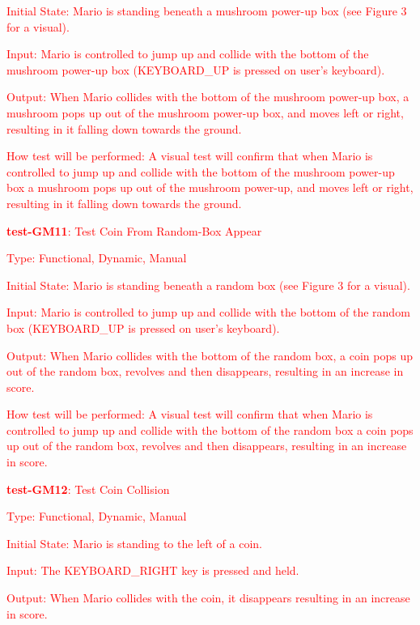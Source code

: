 \documentclass[12pt, titlepage]{article}
\begin{document}
\begin{enumerate}
\textcolor{red}{Initial State: Mario is standing beneath a mushroom power-up box (see Figure 3 for a visual).}

\textcolor{red}{Input: Mario is controlled to jump up and collide with the bottom of the mushroom power-up box (KEYBOARD\_UP is pressed on user's keyboard).}

\textcolor{red}{Output: When Mario collides with the bottom of the mushroom power-up box, a mushroom pops up out of the mushroom power-up box, and moves left or right, resulting in it falling down towards the ground.}

\textcolor{red}{How test will be performed: A visual test will confirm that when Mario is controlled to jump up and collide with the bottom of the mushroom power-up box a mushroom pops up out of the mushroom power-up, and moves left or right, resulting in it falling down towards the ground.}

\textcolor{red}{\item{\textbf{test-GM11}: Test Coin From Random-Box Appear\\}}

\textcolor{red}{Type: Functional, Dynamic, Manual}

\textcolor{red}{Initial State: Mario is standing beneath a random box (see Figure 3 for a visual).}

\textcolor{red}{Input: Mario is controlled to jump up and collide with the bottom of the random box (KEYBOARD\_UP is pressed on user's keyboard).}

\textcolor{red}{Output: When Mario collides with the bottom of the random box, a coin pops up out of the random box, revolves and then disappears, resulting in an increase in score.}

\textcolor{red}{How test will be performed: A visual test will confirm that when Mario is controlled to jump up and collide with the bottom of the random box a coin pops up out of the random box, revolves and then disappears, resulting in an increase in score.}

\textcolor{red}{\item{\textbf{test-GM12}: Test Coin Collision\\}}

\textcolor{red}{Type: Functional, Dynamic, Manual}

\textcolor{red}{Initial State: Mario is standing to the left of a coin.}

\textcolor{red}{Input: The KEYBOARD\_RIGHT key is pressed and held.}

\textcolor{red}{Output: When Mario collides with the coin, it disappears resulting in an increase in score.}


\end{enumerate}
\end{document}
